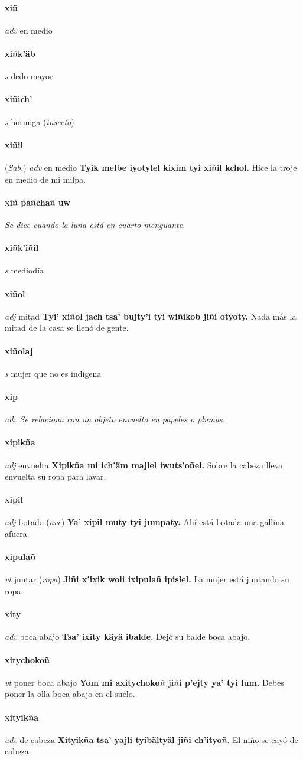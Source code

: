 \documentclass{scrbook}
\newcommand{\entry}[1]{\paragraph{#1}}
\newcommand{\nontranslationdef}[1]{\textit{#1}}
\newcommand{\partofspeech}[1]{\textit{#1}}
\newcommand{\spanishtranslation}[1]{#1}
\newcommand{\clarification}[1]{(\textit{#1})}
\newcommand{\cholexample}[1]{\textbf{#1}}
\newcommand{\exampletranslation}[1]{#1}
\newcommand{\relevantdialect}[1]{(\textit{#1})}
\begin{document}
\begin{multicols}{2}
\entry{xiñ}
\partofspeech{adv}
\spanishtranslation{en medio}

\entry{xiñk'äb}
\partofspeech{s}
\spanishtranslation{dedo mayor}

\entry{xiñich'}
\partofspeech{s}
\spanishtranslation{hormiga}
\clarification{insecto}

\entry{xiñil}
\relevantdialect{Sab.}
\partofspeech{adv}
\spanishtranslation{en medio}
\cholexample{Tyik melbe iyotylel kixim tyi xiñil kchol.}
\exampletranslation{Hice la troje en medio de mi milpa.}

\entry{xiñ pañchañ uw}
\nontranslationdef{Se dice cuando la luna está en cuarto menguante.}

\entry{xiñk'iñil}
\partofspeech{s}
\spanishtranslation{mediodía}

\entry{xiñol}
\partofspeech{adj}
\spanishtranslation{mitad}
\cholexample{Tyi' xiñol jach tsa' bujty'i tyi wiñikob jiñi otyoty.}
\exampletranslation{Nada más la mitad de la casa se llenó de gente.}

\entry{xiñolaj}
\partofspeech{s}
\spanishtranslation{mujer que no es indígena}

\entry{xip}
\partofspeech{adv}
\nontranslationdef{Se relaciona con un objeto envuelto en papeles o plumas.}

\entry{xipikña}
\partofspeech{adj}
\spanishtranslation{envuelta}
\cholexample{Xipikña mi ich'äm majlel iwuts'oñel.}
\exampletranslation{Sobre la cabeza lleva envuelta su ropa para lavar.}

\entry{xipil}
\partofspeech{adj}
\spanishtranslation{botado}
\clarification{ave}
\cholexample{Ya' xipil muty tyi jumpaty.}
\exampletranslation{Ahí está botada una gallina afuera.}

\entry{xipulañ}
\partofspeech{vt}
\spanishtranslation{juntar}
\clarification{ropa}
\cholexample{Jiñi x'ixik woli ixipulañ ipislel.}
\exampletranslation{La mujer está juntando su ropa.}

\entry{xity}
\partofspeech{adv}
\spanishtranslation{boca abajo}
\cholexample{Tsa' ixity käyä ibalde.}
\exampletranslation{Dejó su balde boca abajo.}

\entry{xitychokoñ}
\partofspeech{vt}
\spanishtranslation{poner boca abajo}
\cholexample{Yom mi axitychokoñ jiñi p'ejty ya' tyi lum.}
\exampletranslation{Debes poner la olla boca abajo en el suelo.}

\entry{xityikña}
\partofspeech{adv}
\spanishtranslation{de cabeza}
\cholexample{Xityikña tsa' yajli tyibältyäl jiñi ch'ityoñ.}
\exampletranslation{El niño se cayó de cabeza.}


\end{multicols}
\end{document}
